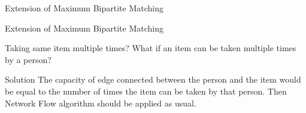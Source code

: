 \documentclass{beamer}
\begin{document}
\begin{frame}{Extension of Maximum Bipartite Matching}
\begin{tikzpicture}
            
            

        \end{tikzpicture}
    
    
\end{frame}

\begin{frame}{Extension of Maximum Bipartite Matching}
    \begin{block}{Taking same item multiple times? }
    What if an item can be taken multiple times by a person?
\end{block}
    \pause
    \begin{block}{Solution}
        The capacity of edge connected between the  person and the item would be equal to the number of times the item can be taken by that person. Then Network Flow algorithm should be applied as usual.
    \end{block}
\end{frame}
\end{document}
